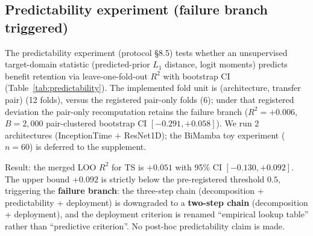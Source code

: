 \documentclass[review,12pt,nonatbib]{elsarticle}
\begin{document}
\subsection{Predictability experiment (failure branch triggered)}
\label{sec:predictability}
The predictability experiment (protocol \S8.5) tests whether an
unsupervised target-domain statistic (predicted-prior $L_1$ distance,
logit moments) predicts benefit retention via leave-one-fold-out
$R^2$ with bootstrap CI (Table~\ref{tab:predictability}). The
implemented fold unit is (architecture, transfer pair) (12 folds),
versus the registered pair-only folds (6); under that registered
deviation the pair-only recomputation retains the failure branch
($R^2=+0.006$, $B{=}2{,}000$ pair-clustered bootstrap CI
$[-0.291, +0.058]$). We run 2 architectures (InceptionTime + ResNet1D);
the BiMamba toy experiment ($n=60$) is deferred to the supplement.

Result: the merged LOO $R^2$ for TS is $+0.051$ with 95\% CI
$[-0.130, +0.092]$. The upper bound $+0.092$ is strictly below the
pre-registered threshold $0.5$, triggering the \textbf{failure
branch}: the three-step chain (decomposition + predictability +
deployment) is downgraded to a \textbf{two-step chain} (decomposition
+ deployment), and the deployment criterion is renamed ``empirical
lookup table'' rather than ``predictive criterion''. No post-hoc
predictability claim is made.
\end{document}
